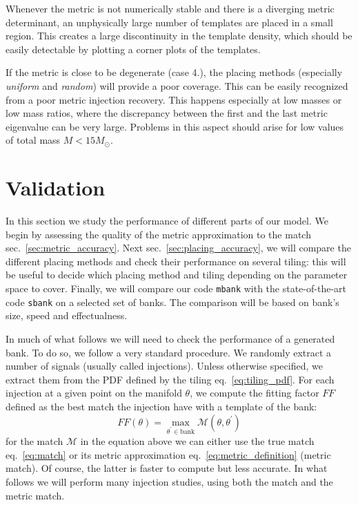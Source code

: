 \documentclass[twocolumn,showpacs,preprintnumbers,nofootinbib,prd,
superscriptaddress,10pt]{revtex4-2}
\begin{document}
Whenever the metric is not numerically stable and there is a diverging metric determinant, an unphysically large number of templates are placed in a small region. This creates a large discontinuity in the template density, which should be easily detectable by plotting a corner plots of the templates.

If the metric is close to be degenerate (case 4.), the placing methods (especially {\it uniform} and {\it random}) will provide a poor coverage. This can be easily recognized from a poor metric injection recovery. This happens especially at low masses or low mass ratios, where the discrepancy between the first and the last metric eigenvalue can be very large. Problems in this aspect should arise for low values of total mass $M<15 M_{\odot}$.

\section{Validation} \label{sec:validation}

In this section we study the performance of different parts of our model. We begin by assessing the quality of the metric approximation to the match sec.~\ref{sec:metric_accuracy}.
Next sec.~\ref{sec:placing_accuracy}, we will compare the different placing methods and check their performance on several tiling: this will be useful to decide which placing method and tiling depending on the parameter space to cover.
Finally, we will compare our code \texttt{mbank} with the state-of-the-art code \texttt{sbank} \cite{sbank} on a selected set of banks. The comparison will be based on bank's size, speed and effectualness.

In much of what follows we will need to check the performance of a generated bank. To do so, we follow a very standard procedure. We randomly extract a number of signals (usually called injections). Unless otherwise specified, we extract them from the PDF defined by the tiling eq.~\eqref{eq:tiling_pdf}.
For each injection at a given point on the manifold $\theta$, we compute the fitting factor $FF$ defined as the best match the injection have with a template of the bank:
\begin{equation}\label{eq:FF}
	FF(\theta) = \max_{\theta^\prime \in \text{bank}} \mathcal{M}(\theta, \theta^\prime)
\end{equation}
for the match $\mathcal{M}$ in the equation above we can either use the true match eq.~\eqref{eq:match} or its metric approximation eq.~\eqref{eq:metric_definition} (metric match).
Of course, the latter is faster to compute but less accurate. In what follows we will perform many injection studies, using both the match and the metric match.
\end{document}
